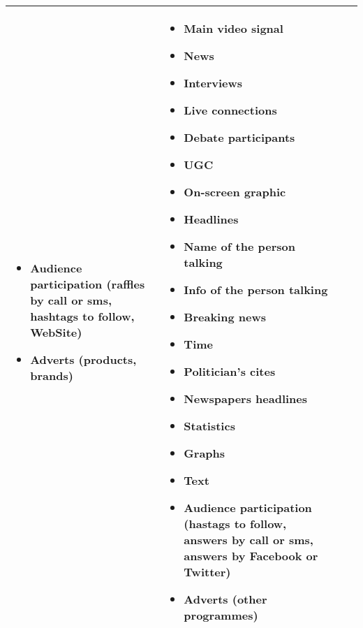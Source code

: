 \begin{table}
\begin{tabular}{||L|L|L|L||}
\begin{itemize}[leftmargin=.1in]
			\item Audience participation (raffles by call or sms, hashtags to follow, WebSite)
			\item Adverts (products, brands)
		\end{itemize}
		& 	
		\begin{itemize}[leftmargin=.1in]
			\setlength{\itemsep}{-0.3\baselineskip}
			\item Main video signal
			\item News 
			\item Interviews 
			\item Live connections 
			\item Debate participants 
			\item UGC 
			\item On-screen graphic 
			\item Headlines 
			\item Name of the person talking 
			\item Info of the person talking 
			\item Breaking news 
			\item Time        
			\item Politician’s cites
			\item Newspapers headlines
			\item Statistics
			\item Graphs
			\item Text
			\item Audience participation (hastags to follow, answers by call or sms, answers by Facebook or Twitter)
			\item Adverts (other programmes)
		\end{itemize} \\
	\hline
	\end{tabular}
\end{table}

